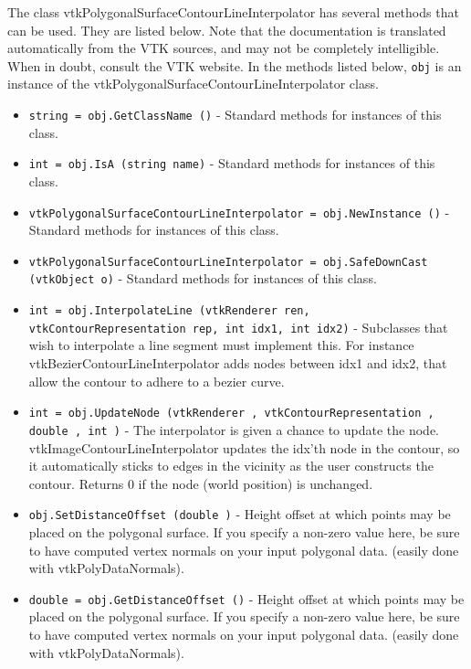 The class vtkPolygonalSurfaceContourLineInterpolator has several methods that can be used.
  They are listed below.
Note that the documentation is translated automatically from the VTK sources,
and may not be completely intelligible.  When in doubt, consult the VTK website.
In the methods listed below, \verb|obj| is an instance of the vtkPolygonalSurfaceContourLineInterpolator class.
\begin{itemize}
\item  \verb|string = obj.GetClassName ()| -  Standard methods for instances of this class.

\item  \verb|int = obj.IsA (string name)| -  Standard methods for instances of this class.

\item  \verb|vtkPolygonalSurfaceContourLineInterpolator = obj.NewInstance ()| -  Standard methods for instances of this class.

\item  \verb|vtkPolygonalSurfaceContourLineInterpolator = obj.SafeDownCast (vtkObject o)| -  Standard methods for instances of this class.

\item  \verb|int = obj.InterpolateLine (vtkRenderer ren, vtkContourRepresentation rep, int idx1, int idx2)| -  Subclasses that wish to interpolate a line segment must implement this.
 For instance vtkBezierContourLineInterpolator adds nodes between idx1
 and idx2, that allow the contour to adhere to a bezier curve.

\item  \verb|int = obj.UpdateNode (vtkRenderer , vtkContourRepresentation , double , int )| -  The interpolator is given a chance to update the node.
 vtkImageContourLineInterpolator updates the idx'th node in the contour, 
 so it automatically sticks to edges in the vicinity as the user 
 constructs the contour. 
 Returns 0 if the node (world position) is unchanged.

\item  \verb|obj.SetDistanceOffset (double )| -  Height offset at which points may be placed on the polygonal surface.
 If you specify a non-zero value here, be sure to have computed vertex
 normals on your input polygonal data. (easily done with 
 vtkPolyDataNormals).

\item  \verb|double = obj.GetDistanceOffset ()| -  Height offset at which points may be placed on the polygonal surface.
 If you specify a non-zero value here, be sure to have computed vertex
 normals on your input polygonal data. (easily done with 
 vtkPolyDataNormals).

\end{itemize}
